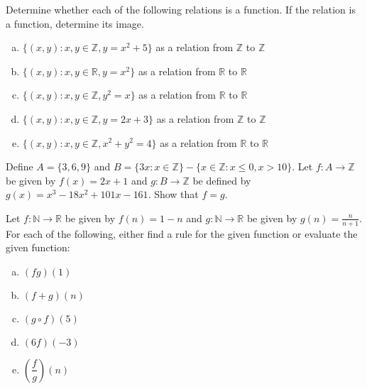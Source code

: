 \documentclass[11pt,letterpaper]{article}
\begin{document}

 Determine whether each of the following relations is a function. If the relation is a function, determine its image.
	\begin{enumerate}[(a)]
	\item $\{ (x, y) \colon x, y \in \mathbb{Z}, y= x^2 + 5 \}$ as a relation from $\mathbb{Z}$ to $\mathbb{Z}$
	\item $\{ (x, y) \colon x, y \in \mathbb{R}, y= x^2 \}$ as a relation from $\mathbb{R}$ to $\mathbb{R}$
	\item $\{ (x, y) \colon x, y \in \mathbb{Z}, y^2= x \}$ as a relation from $\mathbb{R}$ to $\mathbb{R}$
	\item $\{ (x, y) \colon x, y \in \mathbb{Z}, y= 2x + 3 \}$ as a relation from $\mathbb{Z}$ to $\mathbb{Z}$
	\item $\{ (x, y) \colon x, y \in \mathbb{Z}, x^2 + y^2= 4 \}$ as a relation from $\mathbb{R}$ to $\mathbb{R}$
	\end{enumerate} \pspace

%



\newpage



 Define $A= \{ 3, 6, 9 \}$ and $B= \{ 3x \colon x \in \mathbb{Z} \} - \{ x \in \mathbb{Z} \colon x \leq 0, x > 10 \}$. Let $f: A \to \mathbb{Z}$ be given by $f(x)= 2x + 1$ and $g: B \to \mathbb{Z}$ be defined by $g(x)= x^3 - 18x^2 + 101x - 161$. Show that $f= g$.



\newpage



 Let $f: \mathbb{N} \to \mathbb{R}$ be given by $f(n)= 1 - n$ and $g: \mathbb{N} \to \mathbb{R}$ be given by $g(n)= \frac{n}{n + 1}$. For each of the following, either find a rule for the given function or evaluate the given function:
	\begin{enumerate}[(a)]
	\item $(fg)(1)$
	\item $(f + g)(n)$
	\item $(g \circ f)(5)$
	\item $(6f)(-3)$
	\item $\left( \dfrac{f}{g} \right)(n)$
	\end{enumerate}
\end{document}
